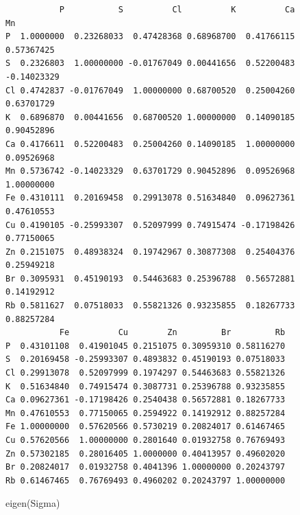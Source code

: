 \documentclass[
  letterpaper,
  DIV=11,
  numbers=noendperiod]{scrartcl}
\newenvironment{Shaded}{\begin{snugshade}}{\end{snugshade}}
\newcommand{\FunctionTok}[1]{\textcolor[rgb]{0.28,0.35,0.67}{#1}}
\newcommand{\NormalTok}[1]{\textcolor[rgb]{0.00,0.23,0.31}{#1}}
\begin{document}
\begin{verbatim}
           P           S          Cl          K          Ca          Mn
P  1.0000000  0.23268033  0.47428368 0.68968700  0.41766115  0.57367425
S  0.2326803  1.00000000 -0.01767049 0.00441656  0.52200483 -0.14023329
Cl 0.4742837 -0.01767049  1.00000000 0.68700520  0.25004260  0.63701729
K  0.6896870  0.00441656  0.68700520 1.00000000  0.14090185  0.90452896
Ca 0.4176611  0.52200483  0.25004260 0.14090185  1.00000000  0.09526968
Mn 0.5736742 -0.14023329  0.63701729 0.90452896  0.09526968  1.00000000
Fe 0.4310111  0.20169458  0.29913078 0.51634840  0.09627361  0.47610553
Cu 0.4190105 -0.25993307  0.52097999 0.74915474 -0.17198426  0.77150065
Zn 0.2151075  0.48938324  0.19742967 0.30877308  0.25404376  0.25949218
Br 0.3095931  0.45190193  0.54463683 0.25396788  0.56572881  0.14192912
Rb 0.5811627  0.07518033  0.55821326 0.93235855  0.18267733  0.88257284
           Fe          Cu        Zn         Br         Rb
P  0.43101108  0.41901045 0.2151075 0.30959310 0.58116270
S  0.20169458 -0.25993307 0.4893832 0.45190193 0.07518033
Cl 0.29913078  0.52097999 0.1974297 0.54463683 0.55821326
K  0.51634840  0.74915474 0.3087731 0.25396788 0.93235855
Ca 0.09627361 -0.17198426 0.2540438 0.56572881 0.18267733
Mn 0.47610553  0.77150065 0.2594922 0.14192912 0.88257284
Fe 1.00000000  0.57620566 0.5730219 0.20824017 0.61467465
Cu 0.57620566  1.00000000 0.2801640 0.01932758 0.76769493
Zn 0.57302185  0.28016405 1.0000000 0.40413957 0.49602020
Br 0.20824017  0.01932758 0.4041396 1.00000000 0.20243797
Rb 0.61467465  0.76769493 0.4960202 0.20243797 1.00000000
\end{verbatim}

\begin{Shaded}
\begin{Highlighting}[]
\FunctionTok{eigen}\NormalTok{(Sigma)}
\end{Highlighting}
\end{Shaded}
\end{document}
